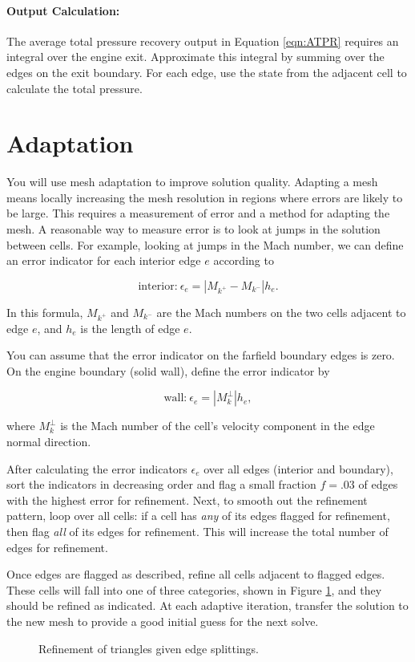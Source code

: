\paragraph{Output Calculation:} The average total pressure recovery output in Equation \ref{eqn:ATPR} requires an integral over the engine exit. Approximate this integral by summing over the edges on the exit boundary. For each edge, use the state from the adjacent cell to calculate the total pressure.


\pagebreak
\section{Adaptation}
You will use mesh adaptation to improve solution quality. Adapting a mesh means locally increasing the mesh resolution in regions where errors are likely to be large. This requires a measurement of error and a method for adapting the mesh. A reasonable way to measure error is to look at jumps in the solution between cells. For example, looking at jumps in the Mach number, we can define an error indicator for each interior edge $e$ according to

\begin{equation*}
    \text{interior:}\ \epsilon_e = |M_{k^+} - M_{k^-}|h_e.
\end{equation*}

In this formula, $M_{k^+}$ and $M_{k^-}$ are the Mach numbers on the two cells adjacent to edge $e$, and $h_e$ is the length of edge $e$.

You can assume that the error indicator on the farfield boundary edges is zero. On the engine boundary (solid wall), define the error indicator by

\begin{equation*}
    \text{wall:}\ \epsilon_e = |M_k^\perp|h_e,
\end{equation*}

where $M_k^\perp$ is the Mach number of the cell’s velocity component in the edge normal direction.

After calculating the error indicators $\epsilon_e$ over all edges (interior and boundary), sort the indicators in decreasing order and flag a small fraction $f = .03$ of edges with the highest error for refinement. Next, to smooth out the refinement pattern, loop over all cells: if a cell has \textit{any} of its edges flagged for refinement, then flag \textit{all} of its edges for refinement. This will increase the total number of edges for refinement.


Once edges are flagged as described, refine all cells adjacent to flagged edges. These cells will fall
into one of three categories, shown in Figure \ref{fig:triangle_refinement}, and they should be refined as indicated. At each adaptive iteration, transfer the solution to the new mesh to provide a good initial guess for the next solve.

\begin{figure}[h]
    \centering
    
    \caption[Refinement of Triangles Given Edge Splittings]{Refinement of triangles given edge splittings.}
    \label{fig:triangle_refinement}
\end{figure}